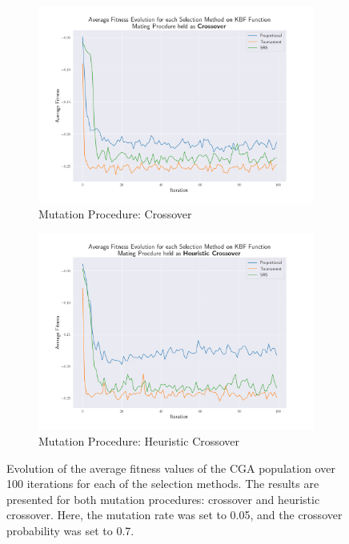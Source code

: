 \documentclass[10pt]{article}
\begin{document}
\begin{figure}[H]
    \centering
    \begin{subfigure}{0.45\textwidth}
        \includegraphics[width=\textwidth]{../figures/Ungenerated Images/Fitness_Evolution_Crossover.png}
        \caption{Mutation Procedure: Crossover}
    \end{subfigure}
    \hfill
    \begin{subfigure}{0.45\textwidth}
        \includegraphics[width=\textwidth]{../figures/Ungenerated Images/Fitness_Evolution_Heuristic Crossover.png}
        \caption{Mutation Procedure: Heuristic Crossover}
    \end{subfigure}
    \captionsetup{justification=centering}
    \caption{Evolution of the average fitness values of the CGA population over 100 iterations for each of the selection methods. The results are presented for both mutation procedures: crossover and heuristic crossover. Here, the mutation rate was set to 0.05, and the crossover probability was set to 0.7.}
    \label{fig:CGA_fitness_evo}
\end{figure}
\end{document}
